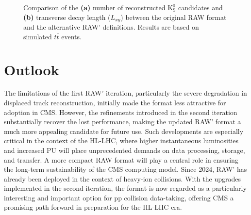 \begin{figure}[!htbp]
    \caption[Reconstruction of $\mathrm{K}_\mathrm{S}^0$ candidates and $L_{xy}$ for RAW and RAW']{Comparison of the \textbf{(a)} number of reconstructed $\mathrm{K}_\mathrm{S}^0$ candidates and \textbf{(b)} transverse decay length ($L_{xy}$) between the original RAW format and the alternative RAW' definitions. Results are based on simulated $t\bar{t}$ events.}
    \label{Figure:Chapter5_KsReconstruction}
\end{figure}

\section{Outlook}

The limitations of the first RAW' iteration, particularly the severe degradation in displaced track reconstruction, initially made the format less attractive for adoption in CMS. However, the refinements introduced in the second iteration substantially recover the lost performance, making the updated RAW' format a much more appealing candidate for future use. Such developments are especially critical in the context of the \ac{HL}-\ac{LHC}, where higher instantaneous luminosities and increased \ac{PU} will place unprecedented demands on data processing, storage, and transfer. A more compact RAW format will play a central role in ensuring the long-term sustainability of the CMS computing model. Since 2024, RAW' has already been deployed in the context of heavy-ion collisions. With the upgrades implemented in the second iteration, the format is now regarded as a particularly interesting and important option for pp collision data-taking, offering CMS a promising path forward in preparation for the \ac{HL}-\ac{LHC} era.